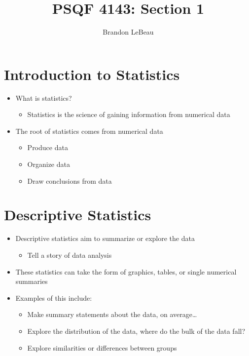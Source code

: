 \documentclass[12pt]{article}
\title{PSQF 4143: Section 1}
\author{Brandon LeBeau}
\date{}
\begin{document}
\maketitle

\section{Introduction to Statistics}\label{introduction-to-statistics}

\begin{itemize}
\itemsep1pt\parskip0pt
\item
  What is statistics?

  \begin{itemize}
  \itemsep1pt\parskip0pt
  \item
    Statistics is the science of gaining information from numerical data
  \end{itemize}
\item
  The root of statistics comes from numerical data

  \begin{itemize}
  \itemsep1pt\parskip0pt
  \item
    Produce data
  \item
    Organize data
  \item
    Draw conclusions from data
  \end{itemize}
\end{itemize}

\section{Descriptive Statistics}\label{descriptive-statistics}

\begin{itemize}
\itemsep1pt\parskip0pt
\item
  Descriptive statistics aim to summarize or explore the data

  \begin{itemize}
  \itemsep1pt\parskip0pt
  \item
    Tell a story of data analysis
  \end{itemize}
\item
  These statistics can take the form of graphics, tables, or single
  numerical summaries
\item
  Examples of this include:

  \begin{itemize}
  \itemsep1pt\parskip0pt
  \item
    Make summary statements about the data, on average\ldots{}
  \item
    Explore the distribution of the data, where do the bulk of the data
    fall?
  \item
    Explore similarities or differences between groups
  \end{itemize}
\end{itemize}
\end{document}
